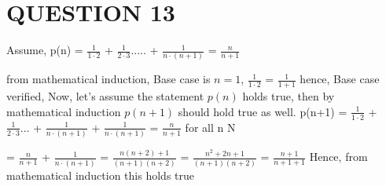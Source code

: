 \documentclass{article}
\begin{document}
\section{QUESTION 13}
\begin{d}
Assume, \newline 
p(n) = $\frac{1}{1\cdot2}$  + $\frac{1}{2\cdot3} ..... $ + $\frac{1}{n\cdot(n+1)} $ = $\frac{n}{n+1}$

from mathematical induction, \newline 
Base case is $n = 1 $,\newline 
$\frac{1}{1\cdot2}$ = $\frac{1}{1+1}$ \newline 
hence, Base case verified, 
Now, let's assume the statement $p(n)$ holds true, then by mathematical induction $p(n+1)$ should hold true as well. 
p(n+1) = $\frac{1}{1\cdot2}$  + $\frac{1}{2\cdot3}...  $ + $\frac{1}{n\cdot(n+1)}$ + $\frac{1}{n\cdot(n+1)}$ = $\frac{n}{n+1}$ for all n \in N

 = $\frac{n}{n+1}$ + $\frac{1}{n\cdot(n+1)}$
 = $\frac{n(n+2)+1}{(n+1)(n+2)}$
 = $\frac{n^2 + 2n+1}{(n+1)(n+2)}$ \newline 
 = $\frac{n+1}{n+1+1}$\newline 
 Hence, from mathematical induction this holds true
 
\end{d}
\end{document}
